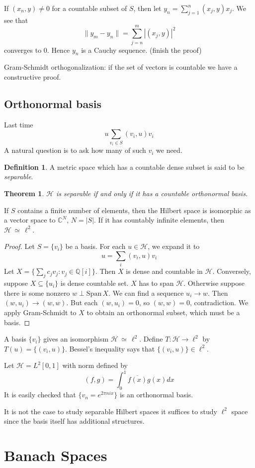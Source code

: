 \documentclass[12pt]{article}
\theoremstyle{plain}
\newtheorem{theorem}[equation]{Theorem}
\theoremstyle{definition}
\newtheorem{definition}[equation]{Definition}
\theoremstyle{named}
\newcommand{\shH}{\mathscr{H}}
\newcommand{\Span}{\mathrm{Span \,}}
\newcommand\iso{{\, \simeq \,}}
\newcommand{\<}{\langle}
\renewcommand{\>}{\rangle}
\newcommand{\IQ}{\mathbb{Q}}
\newcommand{\IC}{\mathbb{C}}
\begin{document}
If $(x_n, y) \neq 0$ for a countable subset of $S$, then let $y_n = \sum_{j = 1}^n (x_j, y)x_j$. We see that 
$$ \| y_m - y_n \| = \sum_{j = n}^m |(x_j, y)|^2 $$
converges to $0$. Hence $y_n$ is a Cauchy sequence. (finish the proof)

Gram-Schmidt orthogonalization: if the set of vectors is countable we have a constructive proof. 

\subsection{Orthonormal basis}
Last time
$$ u \sum_{v_i \in S} (v_i, u)v_i$$
A natural question is to ask how many of such $v_i$ we need. 
\begin{definition}
A metric space which has a countable dense subset is said to be \textit{separable}.
\end{definition}
\begin{theorem}
$\shH$ is separable if and only if it has a countable orthonormal basis. 
\end{theorem}
If $S$ contains a finite number of elements, then the Hilbert space is isomorphic as a vector space to $\IC^N$, $N = |S|$. If it has countably infinite elements, then $\shH \iso \ell^2$. 
\begin{proof}
Let $S = \{ v_i \}$ be a basis. For each $u \in \shH$, we expand it to 
$$ u = \sum_{i} (v_i, u) v_i $$
Let $X =\{ \sum_j c_j v_j : v_j \in \IQ[i] \}$. Then $X$ is dense and countable in $\shH$. 
Conversely, suppose $X \subseteq \{ u_i \}$ is dense countable set. $X$ has to span $\shH$. Otherwise suppose there is some nonzero $w \perp \Span X$. We can find a sequence $u_i \to w$. Then $(w, u_i) \to (w, w)$. But each $(w, u_i) = 0$, so $(w, w) = 0$, contradiction. We apply Gram-Schmidt to $X$ to obtain an orthonormal subset, which must be a basis. 
\end{proof}
A basis $\{v_i\}$ gives an isomorphism $\shH \iso \ell^2$. Define $T : \shH \to \ell^2$ by $T(u) = \{ (v_i, u) \}$. Bessel's inequality says that $\{ (v_i, u) \} \in \ell^2$. 

Let $\shH = L^2[0, 1]$ with norm defined by 
$$ (f, g) = \int_0^1 \overline{f(x)} g(x) dx $$
It is easily checked that $\{v_n = e^{2 \pi n i x}\}$ is an orthonormal basis. 

It is not the case to study separable Hilbert spaces it suffices to study $\ell^2$ space since the basis itself has additional structures. 


\section{Banach Spaces}
\end{document}
